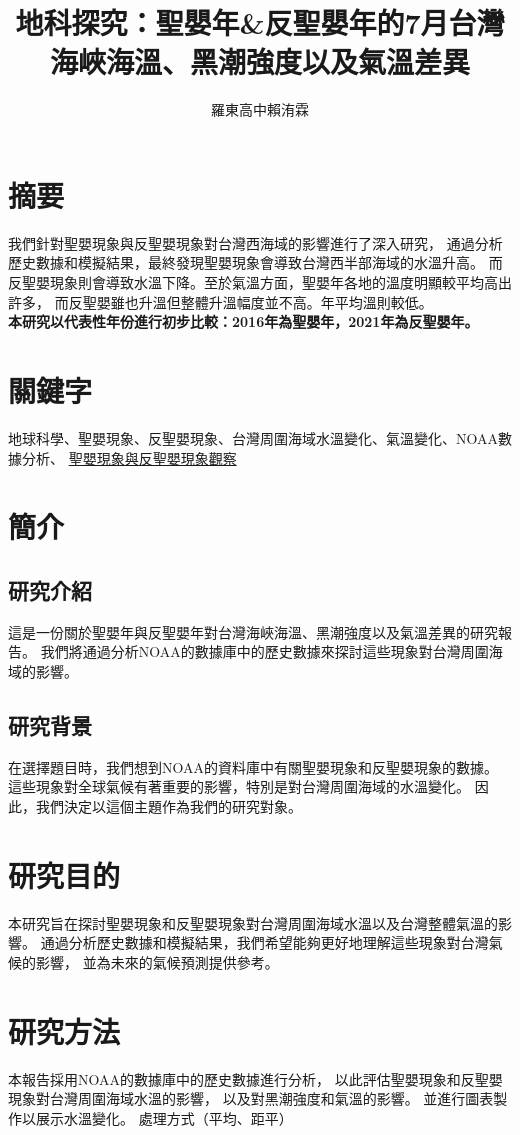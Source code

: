 \documentclass[UTF8, fontset=none,12pt]{ctexart}
\title{\fontsize{25}{30}\selectfont 地科探究：聖嬰年\&反聖嬰年的7月台灣海峽海溫、黑潮強度以及氣溫差異}
\author{\fontsize{16}{14}\selectfont 羅東高中\hspace{4cm}賴洧霖}
\begin{document}
\pagestyle{plain}%
\date{}
\maketitle
\section{摘要}%
我們針對聖嬰現象與反聖嬰現象對台灣西海域的影響進行了深入研究，
通過分析歷史數據和模擬結果，最終發現聖嬰現象會導致台灣西半部海域的水溫升高。
而反聖嬰現象則會導致水溫下降。至於氣溫方面，聖嬰年各地的溫度明顯較平均高出許多，
而反聖嬰雖也升溫但整體升溫幅度並不高。年平均溫則較低。\\

{\fontsize{14}{19}\bfseries \selectfont
 本研究以代表性年份進行初步比較：2016年為聖嬰年，2021年為反聖嬰年。
 }
\section{關鍵字}
地球科學、聖嬰現象、反聖嬰現象、台灣周圍海域水溫變化、氣溫變化、NOAA數據分析、
 \href{https://weilinlai719.github.io/earth-science-explore/}
 {聖嬰現象與反聖嬰現象觀察}
\section{簡介}
\subsection*{研究介紹}
這是一份關於聖嬰年與反聖嬰年對台灣海峽海溫、黑潮強度以及氣溫差異的研究報告。
我們將通過分析NOAA的數據庫中的歷史數據來探討這些現象對台灣周圍海域的影響。
\subsection*{研究背景}
在選擇題目時，我們想到NOAA的資料庫中有關聖嬰現象和反聖嬰現象的數據。
這些現象對全球氣候有著重要的影響，特別是對台灣周圍海域的水溫變化。
因此，我們決定以這個主題作為我們的研究對象。

\section{研究目的}
本研究旨在探討聖嬰現象和反聖嬰現象對台灣周圍海域水溫以及台灣整體氣溫的影響。
通過分析歷史數據和模擬結果，我們希望能夠更好地理解這些現象對台灣氣候的影響，
並為未來的氣候預測提供參考。
\section{研究方法}
本報告採用NOAA的數據庫中的歷史數據進行分析，
以此評估聖嬰現象和反聖嬰現象對台灣周圍海域水溫的影響，
以及對黑潮強度和氣溫的影響。
並進行圖表製作以展示水溫變化。
處理方式（平均、距平）
\end{document}
